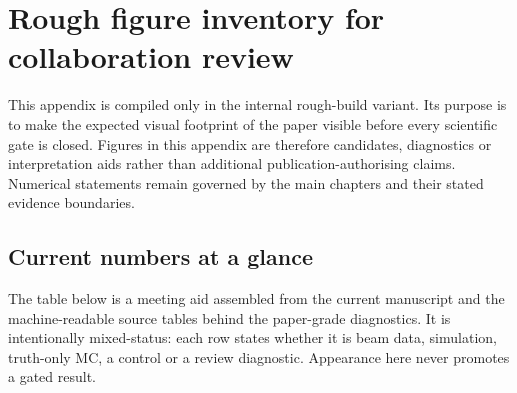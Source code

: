 \section{Rough figure inventory for collaboration review}

This appendix is compiled only in the internal rough-build variant. Its purpose is to make the expected visual footprint of the paper visible before every scientific gate is closed. Figures in this appendix are therefore candidates, diagnostics or interpretation aids rather than additional publication-authorising claims. Numerical statements remain governed by the main chapters and their stated evidence boundaries.

\subsection{Current numbers at a glance}

The table below is a meeting aid assembled from the current manuscript and the machine-readable source tables behind the paper-grade diagnostics. It is intentionally mixed-status: each row states whether it is beam data, simulation, truth-only MC, a control or a review diagnostic. Appearance here never promotes a gated result.

